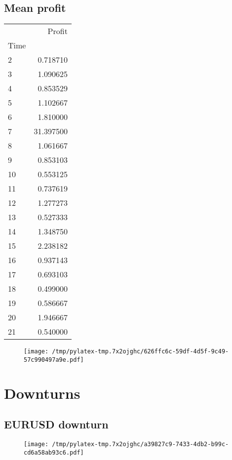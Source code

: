 \documentclass{article}%
\begin{document}
\subsection{Mean profit }%
\label{subsec:Meanprofit}%
\begin{tabular}{lr}
\toprule
{} &     Profit \\
Time &            \\
\midrule
2    &   0.718710 \\
3    &   1.090625 \\
4    &   0.853529 \\
5    &   1.102667 \\
6    &   1.810000 \\
7    &  31.397500 \\
8    &   1.061667 \\
9    &   0.853103 \\
10   &   0.553125 \\
11   &   0.737619 \\
12   &   1.277273 \\
13   &   0.527333 \\
14   &   1.348750 \\
15   &   2.238182 \\
16   &   0.937143 \\
17   &   0.693103 \\
18   &   0.499000 \\
19   &   0.586667 \\
20   &   1.946667 \\
21   &   0.540000 \\
\bottomrule
\end{tabular}
%


\begin{figure}[htbp]%
\centering%
\texttt{[image: /tmp/pylatex-tmp.7x2ojghc/626ffc6c-59df-4d5f-9c49-57c990497a9e.pdf]}%
\end{figure}

%
\newpage %
\section{Downturns}%
\label{sec:Downturns}%
\subsection{EURUSD downturn}%
\label{subsec:EURUSDdownturn}%


\begin{figure}[htbp]%
\centering%
\texttt{[image: /tmp/pylatex-tmp.7x2ojghc/a39827c9-7433-4db2-b99c-cd6a58ab93c6.pdf]}%
\end{figure}
\end{document}
